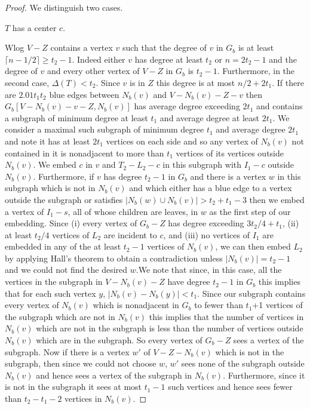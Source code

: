 \documentclass[10pt,a4paper]{amsart}
\begin{document}
\begin{proof}
We distinguish two cases.
   
 $T$ has a center $c$.

Wlog $V-Z$ contains a vertex $v$ such that the degree of $v$  in $G_b$ is at least $\lceil n-1/2 \rceil \ge t_2-1$. Indeed either $v$ has degree at least $t_2$ or $n=2t_2-1$  and the degree of $v$ and every other vertex of $V-Z$ in $G_b$ is  $t_2-1$. Furthermore, in the second case, $\Delta(T)<t_2$.
Since $v$ is in $Z$ this  degree is at most $n/2+2t_1$.   If there 
are $2.01t_1t_2$ blue  edges between $N_b(v)$ and $V-N_b(v)-Z-v$ then $G_b[V-N_b(v)-v-Z,N_b(v)]$ has average degree exceeding $2t_1$ and contains a subgraph of minimum degree at least $t_1$ and average degree at least $2t_1$. We consider a maximal such subgraph of minimum degree $t_1$ and average degree $2t_1$ and note it  has at least $2t_1$ vertices on each side and so any vertex of $N_b(v)$ not contained in it is nonadjacent to more than $t_1$ vertices of its vertices outside $N_b(v)$. We embed $c$ in $v$ and $T_2-L_2-c$ in this subgraph with $I_1-c$ outside 
$N_b(v)$. Furthermore, if $v$ has degree $t_2-1$ in $G_b$ and there is a vertex $w$  in this subgraph which is not in $N_b(v)$ and which either has a blue edge to a vertex outside the subgraph or satisfies $|N_b(w) \cup N_b(v)|> t_2+t_1-3$
then we embed a vertex of $I_1-s$, all of whose children are leaves,  in $w$ as the first step of our embedding.  Since (i) every vertex of $G_b-Z$ has degree exceeding  $3t_2/4+t_1$, 
(ii) at least  $t_2/4$ vertices of $L_2$ are incident to $c$, and (iii) no vertices of $I_1$ are embedded in any of the at
least $t_2-1$ vertices of $N_b(v)$,  we can then embed $L_2$ by applying Hall's theorem to obtain a contradiction unless $|N_b(v)|=t_2-1$
and we could not find the desired $w$.We note that since, in this case,  all the vertices in the subgraph in $V-N_b(v)-Z$ have degree $t_2-1$ in $G_b$  this implies 
that for each such vertex $y$, $|N_b(v)-N_b(y)|<t_1$. Since our subgraph contains every vertex of $N_b(v)$ which is nonadjacent  in $G_b$ to 
fewer than $t_1$+1 vertices of the subgraph which are not in $N_b(v)$ this implies that the number of vertices 
in $N_b(v)$ which are not in the subgraph is less than the number of vertices outside $N_b(v)$ which are in the subgraph.
So every vertex of $G_b-Z$ sees a vertex of the subgraph. Now if there is a vertex $w'$ of  $V-Z-N_b(v)$  which is  not in the subgraph, then since we could not choose $w$,  $w'$ sees none of the subgraph outside $N_b(v)$ and hence sees a vertex of the subgraph in  $N_b(v)$. Furthermore, since it is not in the subgraph it sees at most $t_1-1$ such vertices and hence sees fewer than $t_2-t_1-2$   vertices in $N_b(v)$. 

\end{proof}
\end{document}
